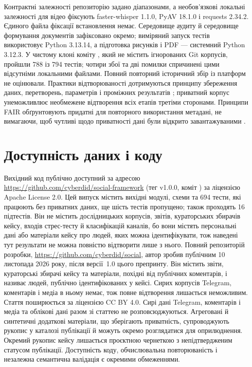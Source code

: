 Контрактні залежності репозиторію задано діапазонами, а необов'язкові локальні залежності для відео фіксують faster-whisper 1.1.0, PyAV 18.1.0 і requests 2.34.2. Єдиного файла фіксації встановлення немає. Середовище аудиту й середовище формування документів зафіксовано окремо; виміряний запуск тестів використовує Python 3.13.14, а підготовка рисунків і PDF --- системний Python 3.12.3. У чистому клоні коміту , який не містить ігнорованих Git корпусів, пройшли 788 із 794 тестів; чотири збої та дві помилки спричинені цими відсутніми локальними файлами. Повний повторний історичний збір із платформ не оцінювали. Практики відтворюваності дотримуються принципу збереження даних, перетворень, параметрів і проміжних результатів \citep{sandve2013reproducible,wilson2017practices}; приватний корпус унеможливлює необмежене відтворення всіх етапів третіми сторонами. Принципи FAIR обґрунтовують придатні для повторного використання метадані, не вимагаючи, щоб чутливі щодо приватності дані були відкрито завантажуваними \citep{wilkinson2016fair}.

\section*{Доступність даних і коду}
Вихідний код публічно доступний за адресою \url{https://github.com/cyberdid/social-framework} (тег v1.0.0, коміт ) за ліцензією Apache License 2.0. Цей випуск містить вихідні модулі, схеми та 694 тести, які працюють без приватних даних, ще шість тестів пропущено; також проходять 16 підтестів. Він не містить дослідницьких корпусів, звітів, кураторських збирачів кейсу, входів стрес-тесту й класифікацій каналів, бо вони містять персональні дані або матеріали кейсу про людей, яких можна ідентифікувати, тож наведені тут результати не можна повністю відтворити лише з нього. Повний репозиторій розробки, \url{https://github.com/cyberdid/social}, автор зробив публічним 10 листопада 2026 року, після версії~1.0 цього препринту. Він містить звіти, кураторські збирачі кейсу та матеріали, похідні від публічних коментарів, і називає людей, публічно ідентифікованих у кейсі. Сирих корпусів Telegram, коментарів і медіа в ньому немає, тож повне відтворення лишається неможливим. Стаття поширюється за ліцензією CC BY 4.0. Сирі дані Telegram, коментарів і медіа та облікові дані разом зі статтею не розповсюджуються. Агреговані й синтетичні додаткові матеріали, що зберігають приватність, супроводжують рукопис у каталозі публікації й можуть окремо розглядатися для оприлюднення. Окремий рукопис кейсу лишається проєктною чернеткою з непідтвердженим статусом публікації. Доступність коду, обчислювальна повторюваність і незалежна семантична валідація є окремими обмеженнями.

